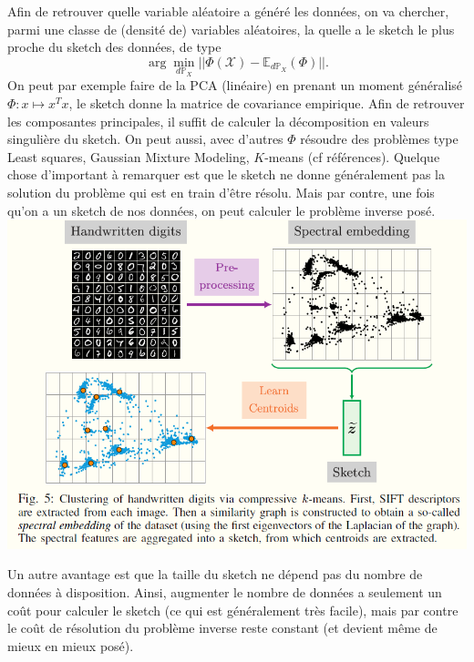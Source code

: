 \documentclass[11pt]{article} %
\begin{document}
\newline
Afin de retrouver quelle variable aléatoire a généré les données, on va chercher, parmi une classe de (densité de) variables aléatoires, la quelle a le sketch le plus proche du sketch des données, de type
\begin{equation}
	\arg\min_{d\mathbb{P}_X} || \Phi(\mathcal{X}) - \mathbb{E}_{d\mathbb{P}_X}(\Phi)||.
\end{equation}
 On peut par exemple faire de la PCA (linéaire) en prenant un moment généralisé $\Phi: x\mapsto x^Tx$, le sketch donne la matrice de covariance empirique. Afin de retrouver les composantes principales, il suffit de calculer la décomposition en valeurs singulière du sketch.
On peut aussi, avec d'autres $\Phi$ résoudre des problèmes type Least squares, Gaussian Mixture Modeling, $K$-means (cf références). Quelque chose d'important à remarquer est que le sketch ne donne généralement pas la solution du problème qui est en train d'être résolu. Mais par contre, une fois qu'on a un sketch de nos données, on peut calculer le problème inverse posé.
\newline
\includegraphics[width=\textwidth]{sketching_mnist}
\par
Un autre avantage est que la taille du sketch ne dépend pas du nombre de données à disposition. Ainsi, augmenter le nombre de données a seulement un coût pour calculer le sketch (ce qui est généralement très facile), mais par contre le coût de résolution du problème inverse reste constant (et devient même de mieux en mieux posé).
\newline
\end{document}
